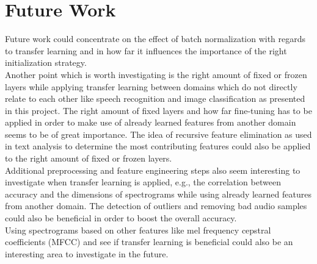 \documentclass{article}
\theoremstyle{definition}
\theoremstyle{remark}
\begin{document}
\section{Future Work} \label{future_work}

Future work could concentrate on the effect of batch normalization with regards to transfer learning and in how far it influences the importance of the right initialization strategy.\\ 
Another point which is worth investigating is the right amount of fixed or frozen layers while applying transfer learning between domains which do not directly relate to each other like speech recognition and image classification as presented in this project. The right amount of fixed layers and how far fine-tuning has to be applied in order to make use of already learned features from another domain seems to be of great importance. The idea of recursive feature elimination as used in text analysis to determine the most contributing features could also be applied to the right amount of fixed or frozen layers.\\
Additional preprocessing and feature engineering steps also seem interesting to investigate when transfer learning is applied, e.g., the correlation between accuracy and the dimensions of spectrograms while using already learned features from another domain. The detection of outliers and removing bad audio samples could also be beneficial in order to boost the overall accuracy.\\
Using spectrograms based on other features like mel frequency cepstral coefficients (MFCC) and see if transfer learning is beneficial could also be an interesting area to investigate in the future.









\end{document}
